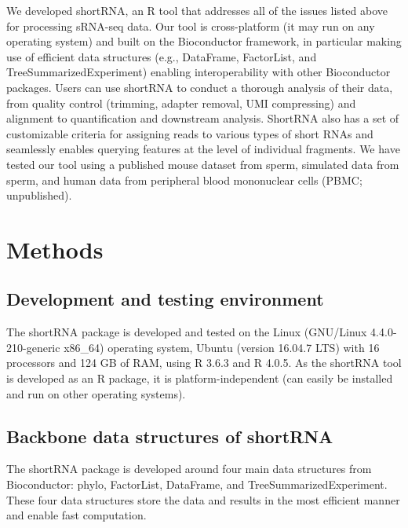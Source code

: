 \documentclass[12pt,twoside]{reedthesis}
\begin{document}
We developed shortRNA, an R tool that addresses all of the issues listed
above for processing sRNA-seq data. Our tool is cross-platform (it may
run on any operating system) and built on the Bioconductor framework, in
particular making use of efficient data structures (e.g., DataFrame,
FactorList, and TreeSummarizedExperiment) enabling interoperability with
other Bioconductor packages. Users can use shortRNA to conduct a
thorough analysis of their data, from quality control (trimming, adapter
removal, UMI compressing) and alignment to quantification and downstream
analysis. ShortRNA also has a set of customizable criteria for assigning
reads to various types of short RNAs and seamlessly enables querying
features at the level of individual fragments. We have tested our tool
using a published mouse dataset from sperm, simulated data from sperm,
and human data from peripheral blood mononuclear cells (PBMC;
unpublished).

\hypertarget{methods-1}{%
\section{Methods}\label{methods-1}}

\hypertarget{development-and-testing-environment}{%
\subsection{Development and testing environment}\label{development-and-testing-environment}}

The shortRNA package is developed and tested on the Linux (GNU/Linux
4.4.0-210-generic x86\_64) operating system, Ubuntu (version 16.04.7 LTS)
with 16 processors and 124 GB of RAM, using R 3.6.3 and R 4.0.5. As the
shortRNA tool is developed as an R package, it is platform-independent
(can easily be installed and run on other operating systems).

\hypertarget{backbone-data-structures-of-shortrna}{%
\subsection{Backbone data structures of shortRNA}\label{backbone-data-structures-of-shortrna}}

The shortRNA package is developed around four main data structures from
Bioconductor: phylo, FactorList, DataFrame, and
TreeSummarizedExperiment. These four data structures store the data and
results in the most efficient manner and enable fast computation.
\end{document}

